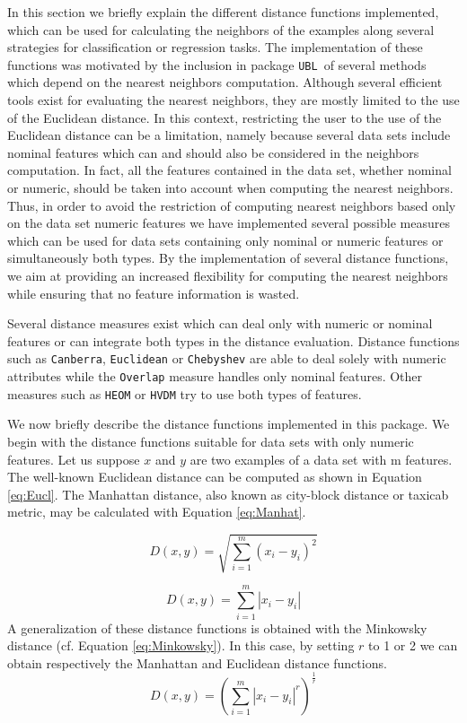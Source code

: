 \documentclass[10pt,a4paper]{article}\usepackage[]{graphicx}\usepackage[]{color}
\newcommand{\UBL}{package \texttt{UBL}\ }
\begin{document}
In this section we briefly explain the different distance functions implemented, which can be used for calculating the neighbors of the examples along several strategies for classification or regression tasks.
The implementation of these functions was motivated by the inclusion in \UBL of several methods which depend on the nearest neighbors computation. Although several efficient tools exist for evaluating the nearest neighbors, they are mostly limited to the use of the Euclidean distance. In this context, restricting the user to the use of the Euclidean distance can be a limitation, namely because several data sets include nominal features which can and should also be considered in the neighbors computation. In fact, all the features contained in the data set, whether nominal or numeric, should be taken into account when computing the nearest neighbors. Thus, in order to avoid the restriction of computing nearest neighbors based only on the data set numeric features we have implemented several possible measures which can be used for data sets containing only nominal or numeric features or simultaneously both types. By the implementation of several distance functions, we aim at providing an increased flexibility for computing the nearest neighbors while ensuring that no feature information is wasted.

Several distance measures exist which can deal only with numeric or nominal features or can integrate both types in the distance evaluation. Distance functions such as \texttt{Canberra}, \texttt{Euclidean} or \texttt{Chebyshev} are able to deal solely with numeric attributes while the \texttt{Overlap} measure handles only nominal features. Other measures such as \texttt{HEOM} or \texttt{HVDM} try to use both types of features.

We now briefly describe the distance functions implemented in this package. We begin with the distance functions suitable for data sets with only numeric features. Let us suppose $x$ and $y$ are two examples of a data set with m features. The well-known Euclidean distance can be computed as shown in Equation \ref{eq:Eucl}. The Manhattan distance, also known as city-block distance or taxicab metric, may be calculated with Equation \ref{eq:Manhat}. 

\begin{equation}\label{eq:Eucl}
D(x,y)=\sqrt{ \sum_{i=1}^{m}(x_i-y_i)^2 }
\end{equation}

\begin{equation}\label{eq:Manhat}
D(x,y)=\sum_{i=1}^{m}|x_i-y_i|
\end{equation}
A generalization of these distance functions is obtained with the Minkowsky distance (cf. Equation \ref{eq:Minkowsky}). In this case, by setting $r$ to 1 or 2 we can obtain respectively the Manhattan and Euclidean distance functions.
\begin{equation}\label{eq:Minkowsky}
D(x,y)=\left( \sum_{i=1}^{m}|x_i-y_i|^r\right) ^{\frac{1}{r}}
\end{equation}
\end{document}
